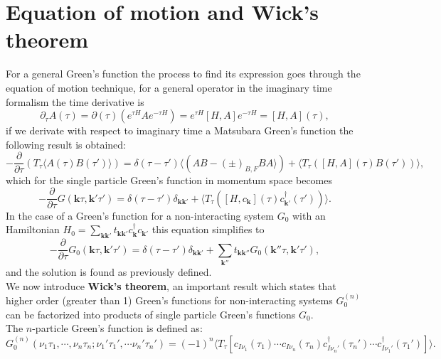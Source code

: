 \documentclass[12pt, a4paper]{report}
\numberwithin{equation}{section}
\begin{document}
\section{Equation of motion and Wick's theorem}
For a general Green's function the process to find its expression goes through the equation of motion technique, for a general 
operator in the imaginary time formalism the time derivative is
\begin{equation}
    \partial_\tau A(\tau)= \partial(\tau)\left(e^{\tau H}Ae^{-\tau H}\right)=e^{\tau H}[H,A]e^{-\tau H}=[H,A](\tau),
\end{equation}
if we derivate with respect to imaginary time a Matsubara Green's function the following result is obtained:
\begin{equation}
    -\frac{\partial}{\partial\tau}\left(T_\tau\langle A(\tau)B(\tau')\rangle\right)=\delta(\tau-\tau')\langle(AB-(\pm)_{B,F}BA\rangle)+\langle T_\tau\left([H,A](\tau)B(\tau')\right)\rangle,
\end{equation}
which for the single particle Green's function in momentum space becomes
\begin{equation}
    -\frac{\partial}{\partial \tau} G(\mathbf{k}\tau,\mathbf{k}'\tau')=\delta(\tau-\tau')\delta_{\mathbf{k}\mathbf{k}'}+\langle T_\tau\left([H,c_\mathbf{k}](\tau)c^\dagger_{\mathbf{k}'}(\tau')\right)\rangle.
\end{equation}
In the case of a Green's function for a non-interacting system $G_0$ with an Hamiltonian $H_0=\sum_{\mathbf{kk}'}t_{\mathbf{kk}'}c^\dagger_\mathbf{k}c_{\mathbf{k}'}$ this equation simplifies to
\begin{equation}
    -\frac{\partial}{\partial\tau}G_0(\mathbf{k}\tau,\mathbf{k}'\tau')=\delta(\tau-\tau')\delta_{\mathbf{k}\mathbf{k}'}+\sum_{\mathbf{k}''}t_{\mathbf{kk}''}G_0(\mathbf{k}''\tau,\mathbf{k}'\tau'),
\end{equation}
and the solution is found as previously defined.\\
We now introduce \textbf{Wick's theorem}, an important result which states that higher order (greater than 1) Green's functions for non-interacting 
systems $G_0^{(n)}$ can be factorized into products of single particle Green's functions $G_0$.\\
The $n$-particle Green's function is defined as:
\begin{equation}
    G_0^{(n)}(\nu_1\tau_1,\cdots,\nu_n\tau_n;\nu_1'\tau_1',\cdots\nu_n'\tau_n')=(-1)^n\langle T_\tau \left[c_{I\nu_1}(\tau_1)\cdots c_{I\nu_n}(\tau_n)c^\dagger_{I\nu_n'}(\tau_n')\cdots c^\dagger_{I\nu_1'}(\tau_1')\right]\rangle. 
    \label{G_0_n-order}
\end{equation}
\end{document}
